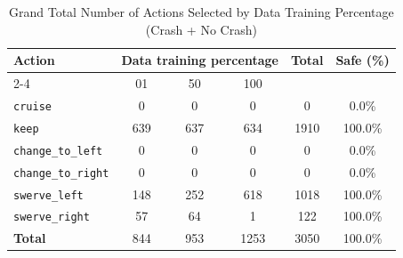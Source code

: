 \documentclass{article}
\begin{document}
\begin{table}[h]
\centering
\caption{Grand Total Number of Actions Selected by Data Training Percentage (Crash + No Crash)}
\begin{tabular}{l|ccc|c|c}
\toprule
\multirow{2}{*}{Action} & \multicolumn{3}{c|}{Data training percentage} & \multirow{2}{*}{Total} & \multirow{2}{*}{Safe (\%)} \\
\cmidrule{2-4}
 & 01 & 50 & 100 & & \\
\midrule
\texttt{cruise} & 0 & 0 & 0 & 0 & 0.0\% \\ 
\texttt{keep} & 639 & 637 & 634 & 1910 & 100.0\% \\ 
\texttt{change\_to\_left} & 0 & 0 & 0 & 0 & 0.0\% \\ 
\texttt{change\_to\_right} & 0 & 0 & 0 & 0 & 0.0\% \\ 
\texttt{swerve\_left} & 148 & 252 & 618 & 1018 & 100.0\% \\ 
\texttt{swerve\_right} & 57 & 64 & 1 & 122 & 100.0\% \\ 
\midrule
\textbf{Total} & 844 & 953 & 1253 & 3050 & 100.0\% \\ 
\bottomrule
\end{tabular}
\end{table}
\end{document}

